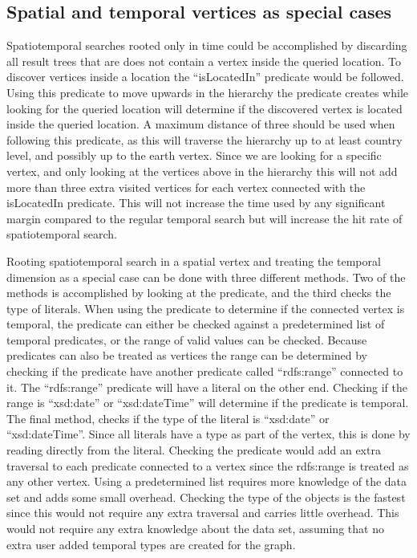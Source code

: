 \subsection{Spatial and temporal vertices as special cases}
Spatiotemporal searches rooted only in time could be accomplished by discarding all result trees that are does not contain a vertex inside the queried location. To discover vertices inside a location the ``isLocatedIn'' predicate would be followed. Using this predicate to move upwards in the hierarchy the predicate creates while looking for the queried location will determine if the discovered vertex is located inside the queried location. A maximum distance of three should be used when following this predicate, as this will traverse the hierarchy up to at least country level, and possibly up to the earth vertex. Since we are looking for a specific vertex, and only looking at the vertices above in the hierarchy this will not add more than three extra visited vertices for each vertex connected with the isLocatedIn predicate. This will not increase the time used by any significant margin compared to the regular temporal search but will increase the hit rate of spatiotemporal search.

Rooting spatiotemporal search in a spatial vertex and treating the temporal dimension as a special case can be done with three different methods. Two of the methods is accomplished by looking at the predicate, and the third checks the type of literals. When using the predicate to determine if the connected vertex is temporal, the predicate can either be checked against a predetermined list of temporal predicates, or the range of valid values can be checked. Because predicates can also be treated as vertices the range can be determined by checking if the predicate have another predicate called ``rdfs:range'' connected to it. The ``rdfs:range'' predicate will have a literal on the other end. Checking if the range is ``xsd:date'' or ``xsd:dateTime'' will determine if the predicate is temporal. The final method, checks if the type of the literal is ``xsd:date'' or ``xsd:dateTime''. Since all literals have a type as part of the vertex, this is done by reading directly from the literal. Checking the predicate would add an extra traversal to each predicate connected to a vertex since the rdfs:range is treated as any other vertex. Using a predetermined list requires more knowledge of the data set and adds some small overhead. Checking the type of the objects is the fastest since this would not require any extra traversal and carries little overhead. This would not require any extra knowledge about the data set, assuming that no extra user added temporal types are created for the graph.

